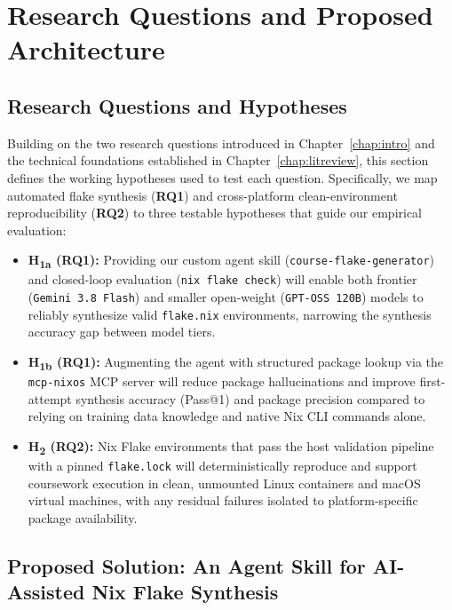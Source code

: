 \chapter{Research Questions and Proposed Architecture}
\label{RQ}

\section{Research Questions and Hypotheses}
\label{sec:rqs}

Building on the two research questions introduced in Chapter~\ref{chap:intro} and
the technical foundations established in Chapter~\ref{chap:litreview}, this
section defines the working hypotheses used to test each question. Specifically,
we map automated flake synthesis (\textbf{RQ1}) and cross-platform clean-environment
reproducibility (\textbf{RQ2}) to three testable hypotheses that guide our empirical
evaluation:
\begin{itemize}
	\item \textbf{H\textsubscript{1a} (RQ1):} Providing our custom agent skill (\texttt{course-flake-generator})
	      and closed-loop evaluation (\texttt{nix flake check}) will enable both
	      frontier (\texttt{Gemini 3.8 Flash}) and smaller open-weight (\texttt{GPT-OSS
		      120B}) models to reliably synthesize valid \texttt{flake.nix} environments,
	      narrowing the synthesis accuracy gap between model tiers.

	\item \textbf{H\textsubscript{1b} (RQ1):} Augmenting the agent with
	      structured package lookup via the \texttt{mcp-nixos} MCP server will reduce
	      package hallucinations and improve first-attempt synthesis accuracy (Pass@1)
	      and package precision compared to relying on training data knowledge and native
	      Nix CLI commands alone.

	\item \textbf{H\textsubscript{2} (RQ2):} Nix Flake environments that pass
	      the host validation pipeline with a pinned \texttt{flake.lock} will deterministically
	      reproduce and support coursework execution in clean, unmounted Linux
	      containers and macOS virtual machines, with any residual failures isolated
	      to platform-specific package availability.
\end{itemize}

\section{Proposed Solution: An Agent Skill for AI-Assisted Nix Flake Synthesis}
\label{chap:solution}

